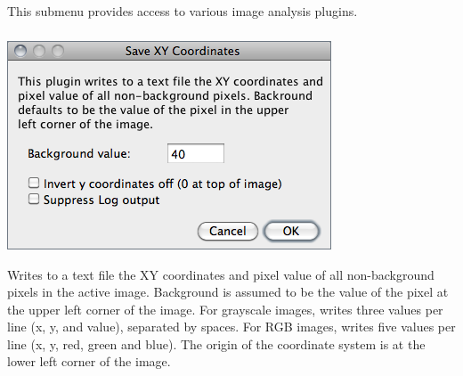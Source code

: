 

\subsection{\protect{}\label{sub:Tools}}

This submenu provides access to various image analysis plugins.


\subsubsection{\protect{}}

\begin{minipage}[c][1\totalheight][t]{0.5\columnwidth}%
\includegraphics[scale=0.55]{images/SaveXYcoordinates}%
\end{minipage}%
\begin{minipage}[c][1\totalheight][t]{0.5\columnwidth}%
Writes to a text file the XY coordinates and pixel value of all non-background
pixels in the active image. Background is assumed to be the value
of the pixel at the upper left corner of the image. For grayscale
images, writes three values per line (x, y, and value), separated
by spaces. For RGB images, writes five values per line (x, y, red,
green and blue). The origin of the coordinate system is at the lower
left corner of the image.%
\end{minipage}

